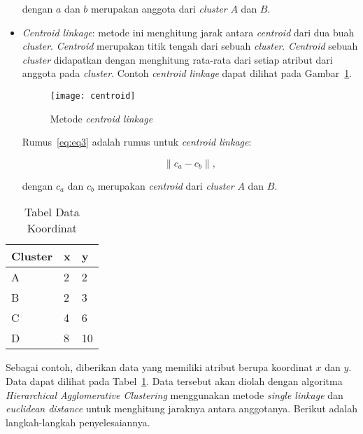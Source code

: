 \begin{itemize}
dengan $a$ dan $b$ merupakan anggota dari \textit{cluster} $A$ dan $B$.\\


\item \textit{Centroid linkage}: metode ini menghitung jarak antara \textit{centroid} dari dua buah \textit{cluster}.  \textit{Centroid} merupakan titik tengah dari sebuah \textit{cluster}. \textit{Centroid} sebuah \textit{cluster} didapatkan dengan menghitung rata-rata dari setiap atribut dari anggota pada \textit{cluster}. Contoh  \textit{centroid linkage} dapat dilihat pada Gambar~\ref{fig:centroid}. 

\begin{figure}[H]
    \centering  
    \texttt{[image: centroid]}  
    \caption[Metode \textit{centroid linkage} ]{Metode \textit{centroid linkage}} 
    \label{fig:centroid} 
\end{figure}

Rumus~\ref{eq:eq3} adalah rumus untuk \textit{centroid linkage}:

\begin{equation} \label{eq:eq3}
\| c_{a} - c_{b} \|, 
\end{equation}

dengan $c_{a}$ dan $c_{b}$ merupakan \textit{centroid} dari \textit{cluster} $A$ dan $B$.\\


\end{itemize}









\begin{table}[H] 
	\centering 
	\caption{Tabel Data Koordinat}
	\label{tab:data}
	\begin{tabular}{|p{1.5cm}|p{1cm}|p{1cm}|}

\hline
 Cluster & x & y \\
\hline
A & 2 & 2 \\
\hline
B & 2 & 3 \\
\hline
C & 4 & 6 \\
\hline
D & 8 & 10 \\
\hline

	\end{tabular} 
\end{table}

Sebagai contoh, diberikan data yang memiliki atribut berupa koordinat $x$ dan $y$. Data dapat dilihat pada Tabel~\ref{tab:data}. Data tersebut akan diolah dengan algoritma \textit{Hierarchical Agglomerative Clustering} menggunakan metode \textit{single linkage} dan \textit{euclidean distance} untuk menghitung jaraknya antara anggotanya. Berikut adalah langkah-langkah penyelesaiannya.



